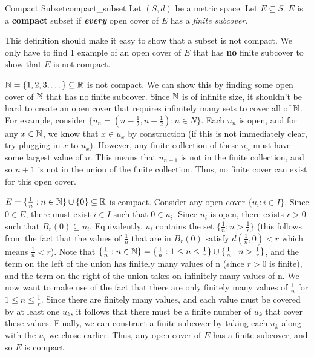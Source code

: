 \begin{defn}{Compact Subset}{compact_subset}
Let \((S, d)\) be a metric space. Let \(E \subseteq S\). \newline 
\(E\) is a \textbf{compact} subset if \textbf{\textit{every}} open cover of \(E\) has a \textit{finite subcover}.
	\newline 
	
	This definition should make it easy to show that a subset is not compact. We only have to find 1 example of an open cover of \(E\) that has \textbf{no} finite subcover to show that \(E\) is not compact.
\end{defn}
\begin{exmp}{}{}
\({\mathbb N} = \{1, 2, 3, \dots\} \subseteq {\mathbb R}\) is not compact. We can show this by finding some open cover of \({\mathbb N}\) that has no finite subcover. Since \({\mathbb N}\) is of infinite size, it shouldn't be hard to create an open cover that requires infinitely many sets to cover all of \({\mathbb N}\). For example, consider \(\{u_n = (n - \frac{1}{2}, n + \frac{1}{2}) : n \in N\}\). Each \(u_n\) is open, and for any \(x \in {\mathbb N}\), we know that \(x \in u_x\) by construction (if this is not immediately clear, try plugging in \(x\) to \(u_x\)). However, any finite collection of these \(u_n\) must have some largest value of \(n\). This means that \(u_{n+1}\) is not in the finite collection, and so \(n + 1\) is not in the union of the finite collection. Thus, no finite cover can exist for this open cover. 
\end{exmp}
\begin{exmp}{}{}
\(E = \{ \frac{1}{n} : n \in {\mathbb N} \} \cup \{0\} \subseteq {\mathbb R}\) is compact. Consider any open cover \(\{u_i : i \in I\}\). Since \(0 \in E\), there must exist \(i \in I\) such that \(0 \in u_i\). Since \(u_i\) is open, there exists \(r > 0\) such that \(B_r(0) \subseteq u_i\). Equivalently, \(u_i\) contains the set \(\{\frac{1}{n} : n > \frac{1}{r}\}\) (this follows from the fact that the values of \(\frac{1}{n}\) that are in \(B_r(0)\) satisfy \(d(\frac{1}{n}, 0) < r\) which means \(\frac{1}{n} < r\)). Note that \(\{ \frac{1}{n} : n \in {\mathbb N} \} = \{ \frac{1}{n} : 1 \leq n \leq \frac{1}{r} \} \cup \{ \frac{1}{n} : n > \frac{1}{r}\}\), and the term on the left of the union has finitely many values of n (since \(r > 0\) is finite), and the term on the right of the union takes on infinitely many values of n. We now want to make use of the fact that there are only finitely many values of \(\frac{1}{n}\) for \(1 \leq n \leq \frac{1}{r}\). Since there are finitely many values, and each value must be covered by at least one \(u_k\), it follows that there must be a finite number of \(u_k\) that cover these values. Finally, we can construct a finite subcover by taking each \(u_k\) along with the \(u_i\) we chose earlier. Thus, any open cover of \(E\) has a finite subcover, and so \(E\) is compact.
\end{exmp}

